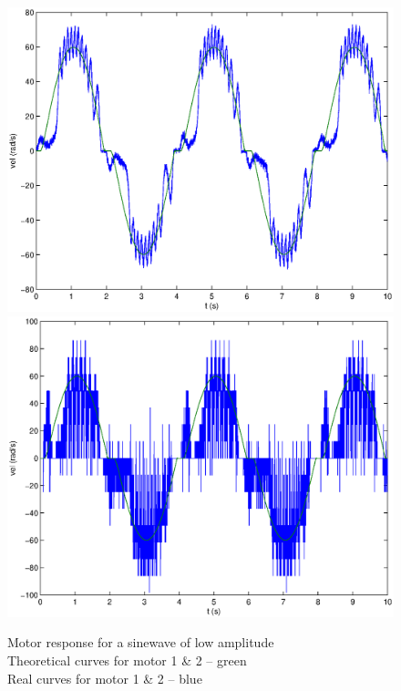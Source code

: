 \begin{center}
\begin{figure}[ht]
 \includegraphics[width=\linewidth]{fig/motor1L2_1.eps}
 \includegraphics[width=\linewidth]{fig/motor2L2_1.eps}
 \caption{Motor response for a sinewave of low amplitude \\ Theoretical curves for motor 1 \& 2 -- green \\ Real curves for motor 1 \& 2 -- blue}
 \label{sinFitted}
\end{figure}
\end{center}

